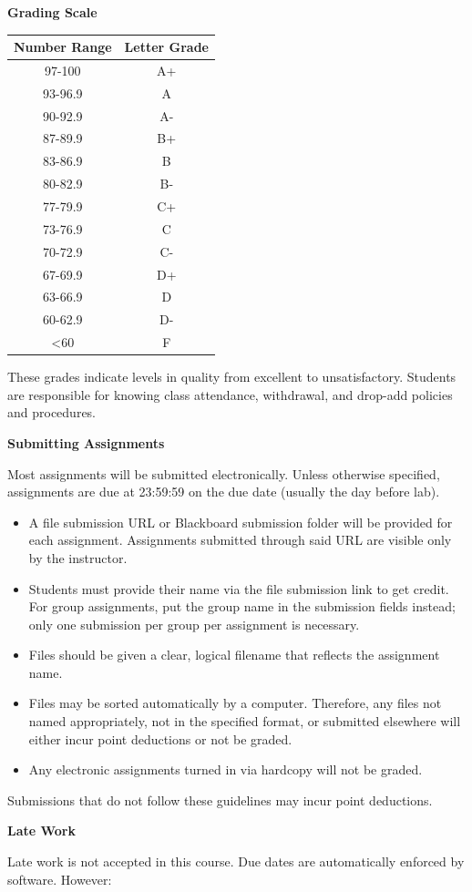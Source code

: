 \documentclass[]{tufte-book}
\providecommand{\tightlist}{%
  \setlength{\itemsep}{0pt}\setlength{\parskip}{0pt}}
\begin{document}
\textbf{Grading Scale}

\begin{longtable}[]{@{}cc@{}}
\toprule
Number Range & Letter Grade\tabularnewline
\midrule
\endhead
97-100 & A+\tabularnewline
93-96.9 & A\tabularnewline
90-92.9 & A-\tabularnewline
87-89.9 & B+\tabularnewline
83-86.9 & B\tabularnewline
80-82.9 & B-\tabularnewline
77-79.9 & C+\tabularnewline
73-76.9 & C\tabularnewline
70-72.9 & C-\tabularnewline
67-69.9 & D+\tabularnewline
63-66.9 & D\tabularnewline
60-62.9 & D-\tabularnewline
\textless60 & F\tabularnewline
\bottomrule
\end{longtable}

These grades indicate levels in quality from excellent to unsatisfactory. Students are responsible for knowing class attendance, withdrawal, and drop-add policies and procedures.

\textbf{Submitting Assignments}

Most assignments will be submitted electronically. Unless otherwise specified, assignments are due at 23:59:59 on the due date (usually the day before lab).

\begin{itemize}
\tightlist
\item
  A file submission URL or Blackboard submission folder will be provided for each assignment. Assignments submitted through said URL are visible only by the instructor.
\item
  Students must provide their name via the file submission link to get credit. For group assignments, put the group name in the submission fields instead; only one submission per group per assignment is necessary.
\item
  Files should be given a clear, logical filename that reflects the assignment name.
\item
  Files may be sorted automatically by a computer. Therefore, any files not named appropriately, not in the specified format, or submitted elsewhere will either incur point deductions or not be graded.
\item
  Any electronic assignments turned in via hardcopy will not be graded.
\end{itemize}

Submissions that do not follow these guidelines may incur point deductions.

\textbf{Late Work}

Late work is not accepted in this course. Due dates are automatically enforced by software. However:
\end{document}
